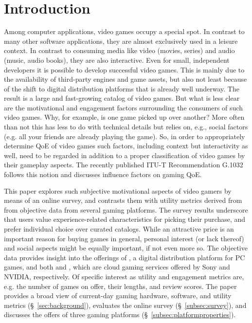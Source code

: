 
\section{Introduction}

Among computer applications, video games occupy a special spot.
In contrast to many other software applications, they are almost
exclusively used in a leisure context.
In contrast to consuming media like video (movies, series) and
audio (music, audio books), they are also interactive.
Even for small, independent developers it is possible to develop successful video games. This is mainly due to the availability of third-party engines and game assets, but also not least because of the shift to digital distribution platforms that is already well underway. The result is a large and fast-growing catalog of video games.
But what is less clear are the motivational and engagement factors surrounding the consumers of such video games. Why, for example, is one game picked up over another? More often than not this has less to do with technical details but relies on, e.g., social factors 
(e.g. all your friends are already playing the game).
So, in order to appropriately determine \gls{QoE} of video games such factors, including context but interactivity as well, need to be regarded in addition to a proper classification of video games by their gameplay aspects.
The recently published \acrshort{ITU-T} Recommendation
G.1032~\cite{itutg1032} follows this notion and discusses influence
factors on gaming \gls{QoE}.

This paper explores such subjective motivational aspects of video gamers
by means of an online survey, and contrasts them with utility
metrics derived from from objective data from several gaming platforms.
The survey results underscore that users value experience-related
characteristics for picking their purchase, and prefer individual choice
over curated catalogs. While an attractive price is an important
reason for buying games in general, personal interest (or lack thereof) and social aspects might be equally important, if not even more so.
The objective data provides insight into the offerings of \steam, a digital distribution platform for PC games, and both \psnow and \gfnow, which are cloud gaming services offered by Sony and NVIDIA, respectively.
Of specific interest as utility and engagement metrics are, e.g. the number
of games on offer, their lengths, and review scores.
The paper provides a broad view of current-day gaming hardware,
software, and utility metrics (\S~\ref{sec:background}),
evaluates the online survey (\S~\ref{subsec:survey}), and
discusses the offers of three gaming platforms
(\S~\ref{subsec:platformproperties}).
